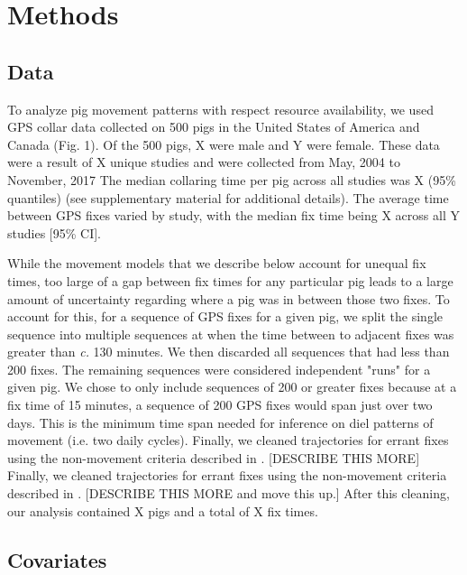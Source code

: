 \documentclass[a4paper]{article}
\begin{document}
\section*{Methods}

\subsection*{Data}

To analyze pig movement patterns with respect resource availability, we used GPS collar data collected on 500 pigs in the United States of America and Canada (Fig. 1).  Of the 500 pigs, X were male and Y were female. These data were a result of X unique studies and were collected from May, 2004 to November, 2017  The median collaring time per pig across all studies was X (95\% quantiles) (see supplementary material for additional details). The average time between GPS fixes varied by study, with the median fix time being X across all Y studies [95\% CI]. 

While the movement models that we describe below account for unequal fix times, too large of a gap between fix times for any particular pig leads to a large amount of uncertainty regarding where a pig was in between those two fixes. To account for this, for a sequence of GPS fixes for a given pig, we split the single sequence into multiple sequences at when the time between to adjacent fixes was greater than \emph{c.} 130 minutes. We then discarded all sequences that had less than 200 fixes. The remaining sequences were considered independent "runs" for a given pig. We chose to only include sequences of 200 or greater fixes because at a fix time of 15 minutes, a sequence of 200 GPS fixes would span just over two days. This is the minimum time span needed for inference on diel patterns of movement (i.e. two daily cycles).  Finally, we cleaned trajectories for errant fixes using the non-movement criteria described in \cite{Bjorneraas2010}. [DESCRIBE THIS MORE]  Finally, we cleaned trajectories for errant fixes using the non-movement criteria described in \cite{Bjorneraas2010}. [DESCRIBE THIS MORE and move this up.] After this cleaning, our analysis contained X pigs and a total of X fix times.

\subsection*{Covariates}
\end{document}
